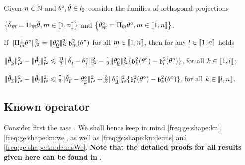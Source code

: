 \begin{lm}\label{re:contr}
Given $\ssY\in\Nz$ and $\xdfPr[],\dxdfPr[]\in\lp[2]$ consider the
  families of  orthogonal projections
  
  $\setB{\dxdfPr=\dProj{\Di}{}\dxdfPr[],\Di\in\nset{1,n}}$ and $\setB{\xdfPr=\dProj{\Di}{}\xdf,\Di\in\nset{1,n}}$.
  
  If $\Vnormlp{\dProj{\Di}{}^\perp\xdf}^2=\Vnormlp{\xdf_{\underline{0}}}^2\bias^2(\xdf)$ for all
  $\Di\in\nset{1,\ssY}$, then for any $l\in\nset{1,n}$ holds
 \begin{resListeN}[]
\item\label{re:contr:e1}
$\Vnormlp{\dxdfPr[k]}^2-\Vnormlp{\dxdfPr[l]}^2\leq
\tfrac{11}{2}\Vnormlp{\dxdfPr[l]-\xdfPr[l]}^2-\tfrac{1}{2}\Vnormlp{\xdf_{\underline{0}}}^2\{\bias[k]^2(\xdf)-\bias[l]^2(\xdf)\}$,
for all $k\in\nsetro{1,l}$;
\item\label{re:contr:e2}
$\Vnormlp{\dxdfPr[k]}^2-\Vnormlp{\dxdfPr[l]}^2\leq \tfrac{7}{2}\Vnormlp{\dxdfPr[k]-\xdfPr[k]}^2+\tfrac{3}{2}\Vnormlp{\xdf_{\underline{0}}}^2
\{\bias[l]^2(\xdf)-\bias[k]^2(\xdf)\}$, for all $k\in\nsetlo{l,n}$.
\end{resListeN}
\reEnd
\end{lm}

\subsection{Known operator}\label{freq:ge:strat:kn}\label{FREQ:GE:STRAT:KN}
Consider first the case .
We shall hence keep in mind \ref{freq:ge:shape:kn}, \ref{freq:ge:shape:kn:we},  as well as \ref{freq:ge:shape:kn:de:ms} and \ref{freq:ge:shape:kn:de:msWe}.
\textbf{Note that the detailed proofs for all results given here can be found in }.

